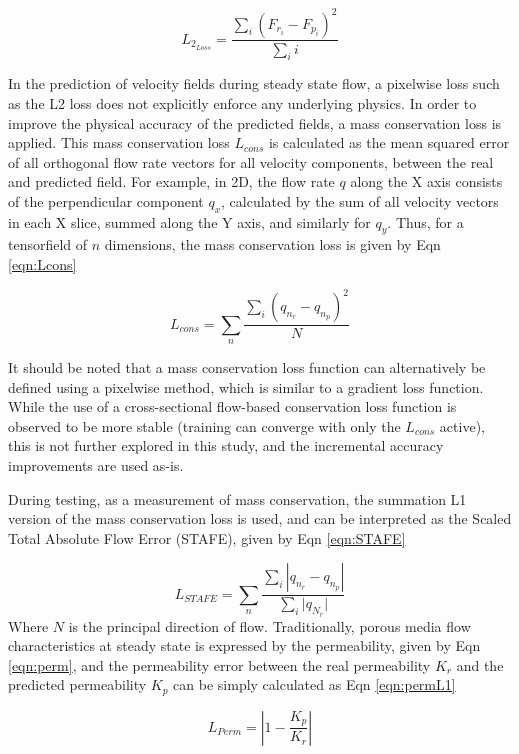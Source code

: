 \documentclass{article}
\begin{document}
\begin{equation}
\label{eqn:L2}
    L_{2_{Loss}}=\frac{\sum_i(F_{r_{i}}-F_{p_{i}})^2}{\sum_ii}
\end{equation}

In the prediction of velocity fields during steady state flow, a pixelwise loss such as the L2 loss does not explicitly enforce any underlying physics. In order to improve the physical accuracy of the predicted fields, a mass conservation loss is applied. This mass conservation loss $L_{cons}$ is calculated as the mean squared error of all orthogonal flow rate vectors for all velocity components, between the real and predicted field. For example, in 2D, the flow rate $q$ along the X axis consists of the perpendicular component $q_{x}$, calculated by the sum of all velocity vectors in each X slice, summed along the Y axis, and similarly for $q_{y}$. Thus, for a tensorfield of $n$ dimensions, the mass conservation loss is given by Eqn \ref{eqn:Lcons}

\begin{equation}
\label{eqn:Lcons}
    L_{cons}=\sum_n\frac{\sum_i(q_{n_{r}}-q_{n_{p}})^2}{N}
\end{equation}

It should be noted that a mass conservation loss function can alternatively be defined using a pixelwise method, which is similar to a gradient loss function. While the use of a cross-sectional flow-based conservation loss function is observed to be more stable (training can converge with only the $L_{cons}$ active), this is not further explored in this study, and the incremental accuracy improvements are used as-is. 

During testing, as a measurement of mass conservation, the summation L1 version of the mass conservation loss is used, and can be interpreted as the Scaled Total Absolute Flow Error (STAFE), given by Eqn \ref{eqn:STAFE}

\begin{equation}
\label{eqn:STAFE}
    L_{STAFE}=\sum_n\frac{\sum_i|q_{n_{r}}-q_{n_{p}}|}{{\sum_i|q_{N_{r}}}|}
\end{equation}
Where $N$ is the principal direction of flow. Traditionally, porous media flow characteristics at steady state is expressed by the permeability, given by Eqn \ref{eqn:perm}, and the permeability error between the real permeability $K_{r}$ and the predicted permeability $K_{p}$ can be simply calculated as Eqn \ref{eqn:permL1}

\begin{equation}
\label{eqn:permL1}
    L_{Perm}=|1-\frac{K_{p}}{K_{r}}|
\end{equation}
\end{document}
